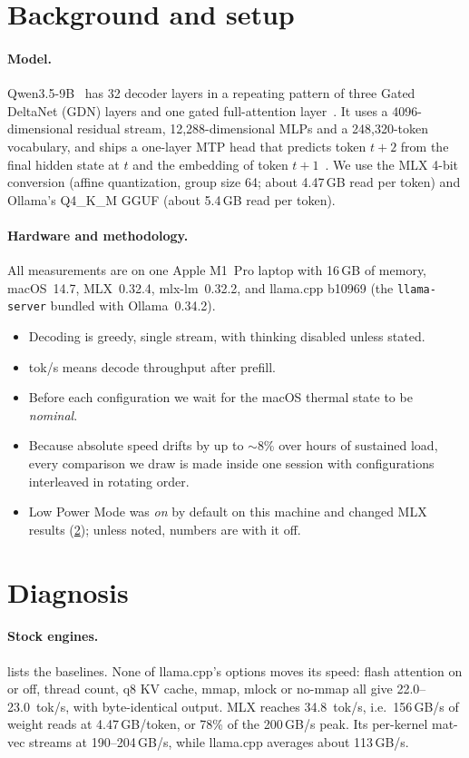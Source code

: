 \documentclass[11pt]{article}
\begin{document}
\section{Background and setup}
\label{sec:background}
\paragraph{Model.} Qwen3.5-9B~\cite{qwen2026qwen35} has 32 decoder layers in a repeating pattern of three Gated DeltaNet (GDN) layers and one gated full-attention layer~\cite{qiu2025gatedattn}. It uses a 4096-dimensional residual stream, 12{,}288-dimensional MLPs and a 248{,}320-token vocabulary, and ships a one-layer MTP head that predicts token $t{+}2$ from the final hidden state at $t$ and the embedding of token $t{+}1$~\cite{gloeckle2024mtp,deepseek2024v3}.
We use the MLX 4-bit conversion (affine quantization, group size 64; about 4.47\,GB read per token) and Ollama's Q4\_K\_M GGUF (about 5.4\,GB read per token).

\paragraph{Hardware and methodology.} All measurements are on one Apple M1~Pro laptop with 16\,GB of memory, macOS~14.7, MLX~0.32.4, mlx-lm~0.32.2, and llama.cpp b10969 (the \texttt{llama-server} bundled with Ollama~0.34.2).
\begin{itemize}
\item Decoding is greedy, single stream, with thinking disabled unless stated.
\item tok/s means decode throughput after prefill.
\item Before each configuration we wait for the macOS thermal state to be \emph{nominal}.
\item Because absolute speed drifts by up to $\sim$8\% over hours of sustained load, every comparison we draw is made inside one session with configurations interleaved in rotating order.
\item Low Power Mode was \emph{on} by default on this machine and changed MLX results (\cref{sec:diagnosis}); unless noted, numbers are with it off.
\end{itemize}

\section{Diagnosis}
\label{sec:diagnosis}
\paragraph{Stock engines.}  lists the baselines. None of llama.cpp's options moves its speed: flash attention on or off, thread count, q8 KV cache, mmap, mlock or no-mmap all give 22.0--23.0~tok/s, with byte-identical output. MLX reaches 34.8~tok/s, i.e.\ 156\,GB/s of weight reads at 4.47\,GB/token, or 78\% of the 200\,GB/s peak. Its per-kernel mat-vec streams at 190--204\,GB/s, while llama.cpp averages about 113\,GB/s.
\end{document}

